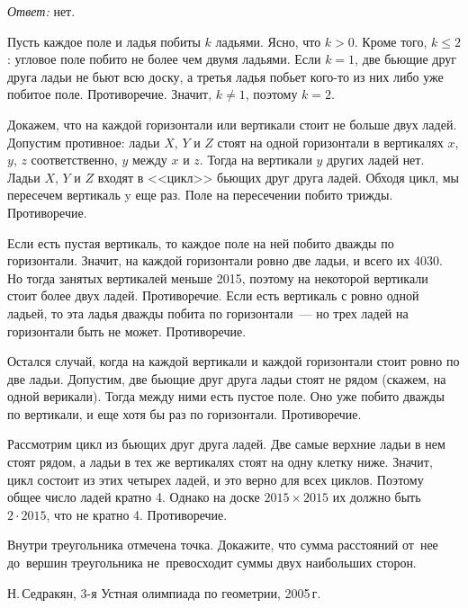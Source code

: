 \ifincludesolutions
\emph{Ответ:} нет.
\par
Пусть каждое поле и ладья побиты $k$ ладьями.
Ясно, что $k > 0$.
Кроме того, $k \leq 2$: угловое поле побито не более чем двумя ладьями.
Если $k = 1$, две бьющие друг друга ладьи не бьют всю доску, а третья ладья
побьет кого-то из них либо уже побитое поле.
Противоречие.
Значит, $k \neq 1$, поэтому $k = 2$.
\par
Докажем, что на каждой горизонтали или вертикали стоит не больше двух ладей.
Допустим противное: ладьи $X$, $Y$ и $Z$ стоят на одной горизонтали
в вертикалях $x$, $y$, $z$ соответственно, $y$ между $x$ и $z$.
Тогда на вертикали $y$ других ладей нет.
Ладьи $X$, $Y$ и $Z$ входят в <<цикл>> бьющих друг друга ладей.
Обходя цикл, мы пересечем вертикаль y еще раз.
Поле на пересечении побито трижды.
Противоречие.
\par
Если есть пустая вертикаль, то каждое поле на ней побито дважды по горизонтали.
Значит, на каждой горизонтали ровно две ладьи, и всего их 4030.
Но тогда занятых вертикалей меньше 2015, поэтому на некоторой вертикали стоит
более двух ладей.
Противоречие.
Если есть вертикаль с ровно одной ладьей, то эта ладья дважды побита
по горизонтали~--- но трех ладей на горизонтали быть не может.
Противоречие.
\par
Остался случай, когда на каждой вертикали и каждой горизонтали стоит ровно
по две ладьи.
Допустим, две бьющие друг друга ладьи стоят не рядом (скажем, на одной
верикали).
Тогда между ними есть пустое поле.
Оно уже побито дважды по вертикали, и еще хотя бы раз по горизонтали.
Противоречие.
\par
Рассмотрим цикл из бьющих друг друга ладей.
Две самые верхние ладьи в нем стоят рядом, а ладьи в тех же вертикалях стоят
на одну клетку ниже.
Значит, цикл состоит из этих четырех ладей, и это верно для всех циклов.
Поэтому общее число ладей кратно 4.
Однако на доске $2015 \times 2015$ их должно быть $2 \cdot 2015$, что
не кратно 4.
Противоречие.
\fi %

\begin{problems}

\item
\ifincludesolutions\label{olympiad/g9-1/r1:n4:problem}\fi
Внутри треугольника отмечена точка.
Докажите, что сумма расстояний от~нее до~вершин треугольника не~превосходит
суммы двух наибольших сторон.
\begingroup\em\small\par\strut\hfill
    Н.\,Седракян, 3-я Устная олимпиада по геометрии, 2005\,г.
\endgroup
\end{problems}

